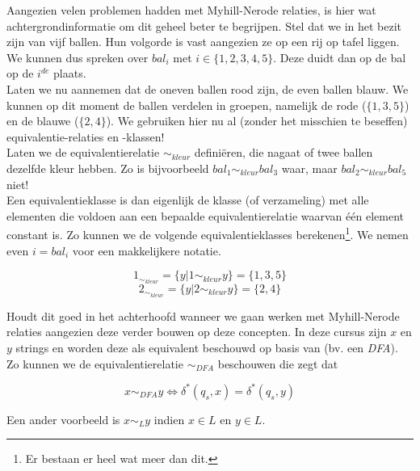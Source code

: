 \documentclass[10pt,a4paper]{article}
\begin{document}
	Aangezien velen problemen hadden met Myhill-Nerode relaties, is hier wat achtergrondinformatie om dit geheel beter te begrijpen. Stel dat we in het bezit zijn van vijf ballen. Hun volgorde is vast aangezien ze op een rij op tafel liggen. We kunnen dus spreken over $bal_i$ met $i \in \{1,2,3,4,5\}$. Deze duidt dan op de bal op de $i^{de}$ plaats.\\

	Laten we nu aannemen dat de oneven ballen rood zijn, de even ballen blauw. We kunnen op dit moment de ballen verdelen in groepen, namelijk de rode ($\{1,3,5\}$) en de blauwe ($\{2,4\}$). We gebruiken hier nu al (zonder het misschien te beseffen) equivalentie-relaties en -klassen!\\

	Laten we de equivalentierelatie $\sim_{kleur}$ defini\"eren, die nagaat of twee ballen dezelfde kleur hebben. Zo is bijvoorbeeld $bal_1 \sim_{kleur} bal_3$ waar, maar $bal_2 \sim_{kleur} bal_5$ niet!\\

	Een equivalentieklasse is dan eigenlijk de klasse (of verzameling) met alle elementen die voldoen aan een bepaalde equivalentierelatie waarvan \'e\'en element constant is. Zo kunnen we de volgende equivalentieklasses berekenen\footnote{Er bestaan er heel wat meer dan dit.}. We nemen even $i = bal_i$ voor een makkelijkere notatie.

	$$1_{\sim_{kleur}} = \{y|1 \sim_{kleur} y\} = \{1,3,5\}$$
	$$2_{\sim_{kleur}} = \{y|2 \sim_{kleur} y\} = \{2,4\}$$

	Houdt dit goed in het achterhoofd wanneer we gaan werken met Myhill-Nerode relaties aangezien deze verder bouwen op deze concepten. In deze cursus zijn $x$ en $y$ strings en worden deze als equivalent beschouwd op basis van (bv. een \emph{DFA}). Zo kunnen we de equivalentierelatie $\sim_{DFA}$ beschouwen die zegt dat

	$$x \sim_{DFA} y \iff \delta^*(q_s,x) = \delta^*(q_s,y)$$

	Een ander voorbeeld is $x \sim_L y$ indien $x \in L$ en $y \in L$.


\newpage











\end{document}
